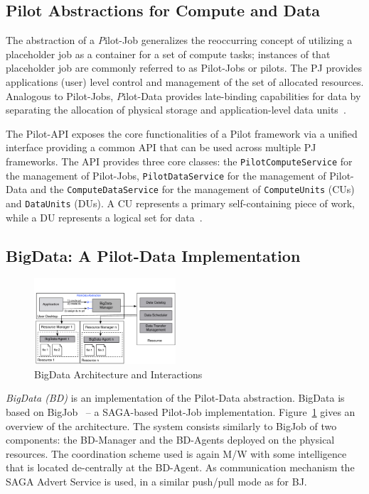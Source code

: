 \documentclass{acm_proc_article-sp}
\newcommand{\pilot}{Pilot\xspace}
\newcommand{\pilotjob}{Pilot-Job\xspace}
\newcommand{\pilotjobs}{Pilot-Jobs\xspace}
\begin{document}
\subsection{Pilot Abstractions for Compute and Data}

The abstraction of a {\emph \pilotjob} generalizes the reoccurring concept of
utilizing a placeholder job as a container for a set of compute tasks;
instances of that placeholder job are commonly referred to as Pilot-Jobs or
pilots. The PJ provides applications (user) level control and management of
the set of allocated resources. Analogous to \pilotjobs, {\emph Pilot-Data}
provides late-binding capabilities for data by separating the allocation of
physical storage and application-level data units~\cite{pstar-2012}.

The Pilot-API exposes the core functionalities of a \pilot framework via a
unified interface providing a common API that can be used across multiple PJ
frameworks. The API provides three core classes: the
\texttt{PilotComputeService} for the management of Pilot-Jobs,
\texttt{PilotDataService} for the management of Pilot-Data and the
\texttt{ComputeDataService} for the management of \texttt{ComputeUnits} (CUs)
and \texttt{DataUnits} (DUs). A CU represents a primary self-containing piece
of work, while a DU represents a logical set for data~\cite{pstar-2012}.

\subsection{BigData: A Pilot-Data Implementation}
\begin{figure}[htbp]
	\centering
		\includegraphics[width=0.47\textwidth]{figures/bigdata.pdf}
	\caption{BigData Architecture and Interactions}
	\label{fig:figures_bigdata}
\end{figure}

{\it BigData (BD)} is an implementation of the Pilot-Data abstraction.
BigData is based on BigJob~\cite{bigjob_web} -- a SAGA-based Pilot-Job
implementation. Figure~\ref{fig:figures_bigdata} gives an overview of the
architecture. The system consists similarly to BigJob of two components: the
BD-Manager and the BD-Agents deployed on the physical resources. The
coordination scheme used is again M/W with some intelligence that is located
de-centrally at the BD-Agent. As communication mechanism the SAGA Advert
Service is used, in a similar push/pull mode as for BJ.
\end{document}
